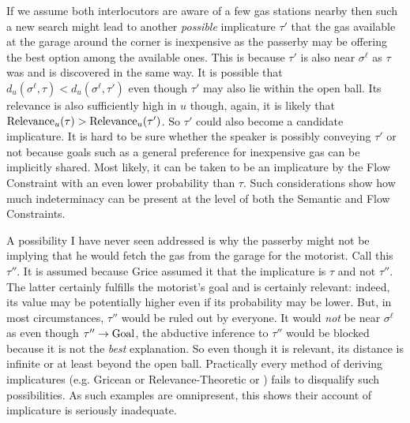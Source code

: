 If we assume both interlocutors are aware of a few gas stations nearby then such a new search might lead to another \emph{possible} implicature $\tau'$ that the gas available at the garage around the corner is inexpensive as the passerby may be offering the best option among the available ones. This is because $\tau'$ is also near $\sigma^\ell$ as $\tau$ was and is discovered in the same way. It is possible that $d_u(\sigma^\ell, \tau) < d_u(\sigma^\ell, \tau')$ even though $\tau'$ may also lie within the open ball. Its relevance is also sufficiently high in $u$ though, again, it is likely that $\hbox{Relevance}_u(\tau) > \hbox{Relevance}_u(\tau')$. So $\tau'$ could also become a candidate implicature. It is hard to be sure whether the speaker is possibly conveying $\tau'$ or not because goals such as a general preference for inexpensive gas can be implicitly shared. Most likely, it can be taken to be an implicature by the Flow Constraint with an even lower probability than $\tau$. Such considerations show how much indeterminacy can be present at the level of both the Semantic and Flow Constraints.


A possibility I have never seen addressed is why the passerby might not be implying that he would fetch the gas from the garage for the motorist. Call this $\tau''$. It is assumed because Grice assumed it that the implicature is $\tau$ and not $\tau''$. The latter certainly fulfills the motorist's goal and is certainly relevant: indeed, its value may be potentially higher even if its probability may be lower. But, in most circumstances, $\tau''$ would be ruled out by everyone. It would \emph{not} be near $\sigma^\ell$ as even though $\tau'' \rightarrow \hbox{Goal}$, the abductive inference to $\tau''$  would be blocked because it is not the \emph{best} explanation. So even though it is relevant, its distance is infinite or at least beyond the open ball. Practically every method of deriving implicatures (e.g. Gricean  or Relevance-Theoretic  or \citealt{benz:i})  fails to disqualify such possibilities. As such examples are omnipresent, this shows their account of implicature is seriously inadequate.

